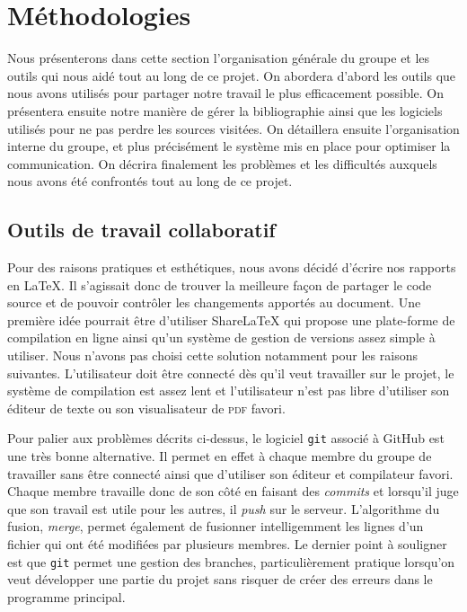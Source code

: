 


\section{Méthodologies}
Nous présenterons dans cette section l'organisation générale du groupe et les outils qui nous aidé tout au long de ce projet.
On abordera d'abord les outils que nous avons utilisés pour partager 
notre travail le plus efficacement possible.
On présentera ensuite notre manière de gérer la bibliographie
ainsi que les logiciels utilisés pour ne pas perdre les sources visitées.
On détaillera ensuite l'organisation interne du groupe, et
plus précisément le système mis en place pour optimiser la communication.
On décrira finalement les problèmes et les difficultés auxquels nous avons été confrontés tout au long de ce projet.


\subsection{Outils de travail collaboratif}
Pour des raisons pratiques et esthétiques, nous avons décidé d'écrire
nos rapports en \LaTeX{}.
Il s'agissait donc de trouver la meilleure façon de partager le code source
et de pouvoir contrôler les changements apportés au document.
Une première idée pourrait être d'utiliser ShareLaTeX qui propose une plate-forme
de compilation en ligne ainsi qu'un système de gestion de versions
assez simple à utiliser.
Nous n'avons pas choisi cette solution notamment pour les raisons suivantes.
L'utilisateur doit être connecté dès qu'il veut travailler sur le projet,
le système de compilation est assez lent et l'utilisateur n'est pas libre
d'utiliser son éditeur de texte ou son visualisateur de \textsc{pdf} favori.

Pour palier aux problèmes décrits ci-dessus, le logiciel \texttt{git}
associé à GitHub est une très bonne alternative.
Il permet en effet à chaque membre du groupe de travailler sans être connecté
ainsi que d'utiliser son éditeur et compilateur favori.
Chaque membre travaille donc de son côté en faisant des \emph{commits}
et lorsqu'il juge que son travail est utile pour les autres, 
il \emph{push} sur le serveur.
L'algorithme du fusion, \emph{merge}, permet également de fusionner intelligemment
les lignes d'un fichier qui ont été modifiées par plusieurs membres.
Le dernier point à souligner est que \texttt{git} permet une gestion des branches,
particulièrement pratique lorsqu'on veut développer une partie du projet
sans risquer de créer des erreurs dans le programme principal.

